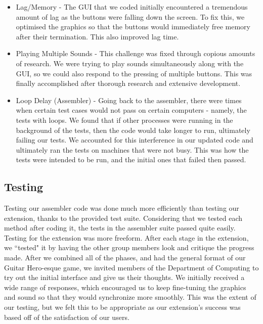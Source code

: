 \documentclass[11pt]{article}
\begin{document}
\begin{itemize}

\item Lag/Memory - The GUI that we coded initially encountered a tremendous amount of lag as the buttons were falling down the screen. To fix this, we optimised the graphics so that the buttons would immediately free memory after their termination. This also improved lag time.

\item Playing Multiple Sounds - This challenge was fixed through copious amounts of research. We were trying to play sounds simultaneously along with the GUI, so we could also respond to the pressing of multiple buttons. This was finally accomplished after thorough research and extensive development.

\item Loop Delay (Assembler) - Going back to the assembler, there were times when certain test cases would not pass on certain computers - namely, the tests with loops. We found that if other processes were running in the background of the tests, then the code would take longer to run, ultimately failing our tests. We accounted for this interference in our updated code and ultimately ran the tests on machines that were not busy. This was how the tests were intended to be run, and the initial ones that failed then passed.

\end{itemize}

\subsection{Testing}

Testing our assembler code was done much more efficiently than testing our extension, thanks to the provided test suite. Considering that we tested each method after coding it, the tests in the assembler suite passed quite easily. Testing for the extension was more freeform. After each stage in the extension, we ``tested" it by having the other group members look and critique the progress made. After we combined all of the phases, and had the general format of our Guitar Hero-esque game, we invited members of the Department of Computing to try out the initial interface and give us their thoughts. We initially received a wide range of responses, which encouraged us to keep fine-tuning the graphics and sound so that they would synchronize more smoothly. This was the extent of our testing, but we felt this to be appropriate as our extension's success was based off of the satisfaction of our users.
\end{document}
